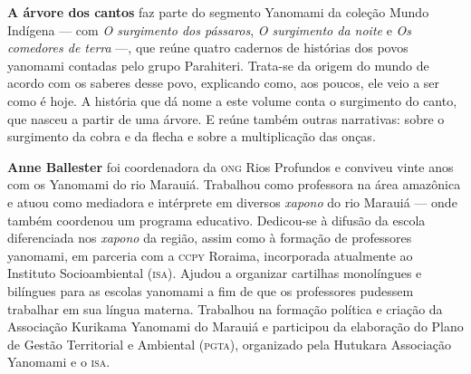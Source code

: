 \textbf{A árvore dos cantos} faz parte do segmento Yanomami da coleção Mundo Indígena --- com \textit{O surgimento dos pássaros}, \textit{O surgimento da noite} e \textit{Os comedores de terra} ---, que reúne quatro cadernos de histórias dos povos yanomami contadas pelo grupo Parahiteri. Trata-se da origem do mundo de acordo com os saberes desse povo, explicando como, aos poucos, ele veio a ser como é hoje. A história que dá nome a este volume conta o surgimento do canto, que nasceu a partir de uma árvore. E reúne também outras narrativas: sobre o surgimento da cobra e da flecha e sobre a multiplicação das onças. 

\textbf{Anne Ballester} foi coordenadora da \textsc{ong} Rios Profundos e conviveu vinte anos com os Yanomami do rio Marauiá. Trabalhou como professora na área amazônica e atuou como mediadora e intérprete em diversos \textit{xapono} do rio Marauiá --- onde também coordenou um programa educativo. Dedicou-se à difusão da escola diferenciada nos \textit{xapono} da região, assim como à formação de professores yanomami, em parceria com a \textsc{ccpy} Roraima, incorporada atualmente ao Instituto Socioambiental (\textsc{isa}). Ajudou a organizar cartilhas monolíngues e bilíngues para as escolas yanomami a fim de que os professores pudessem trabalhar em sua língua materna. Trabalhou na formação política e criação da Associação Kurikama Yanomami do Marauiá e participou da elaboração do Plano de Gestão Territorial e Ambiental (\textsc{pgta}), organizado pela Hutukara Associação Yanomami e o \textsc{isa}.




